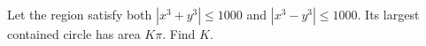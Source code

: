 Let the region satisfy both $|x^3+y^3|\le1000$ and $|x^3-y^3|\le1000$. Its largest contained circle has area $K\pi$. Find $K$.
